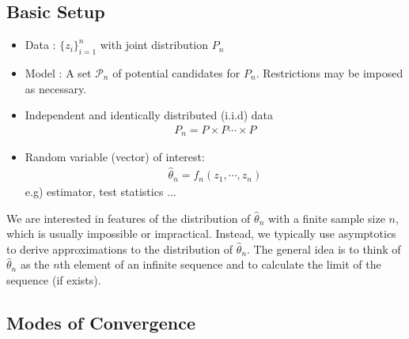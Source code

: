 \documentclass[11pt]{article} %
\theoremstyle{definition}
\numberwithin{defn}{subsection}
\numberwithin{thm}{subsection}
\newtheorem{ex}{Example}
\numberwithin{ex}{subsection}
\newcommand{\iid}{\overset{i.i.d}{\sim}}
\newcommand{\thetah}{\hat{\theta}}
\begin{document}
\subsection{Basic Setup}
\begin{itemize}
	\item Data : $\{z_i \}_{i=1}^n$ with joint distribution $P_n$
	\item Model : A set $\mathcal{P}_n$ of potential candidates for $P_n$. Restrictions may be imposed as necessary.
	\item Independent and identically distributed (i.i.d) data
	\begin{align*}
	P_n=P\times P\cdots \times P
	\end{align*}
	\item Random variable (vector) of interest:
	\begin{align*}
	\thetah_n=f_n(z_1,\cdots,z_n)
	\end{align*}
	e.g) estimator, test statistics ...
\end{itemize}
We are interested in features of the distribution of $\thetah_n$ with a finite sample size $n$, which is usually impossible or impractical.
Instead, we typically use asymptotics to derive approximations to the distribution of $\thetah_n$. The general idea is to think of $\thetah_n$ as the $n$th element of an infinite sequence and to calculate the limit of the sequence (if exists).%

\subsection{Modes of Convergence}
\end{document}
